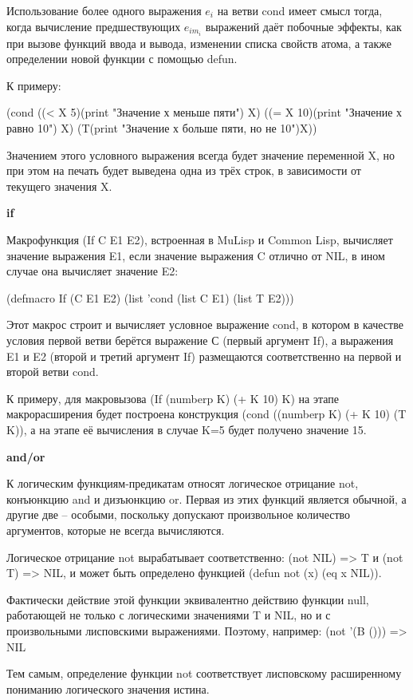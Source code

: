 \documentclass[12pt]{report}
\begin{document}
Использование более одного выражения $e_i$ на ветви cond имеет смысл тогда, когда вычисление предшествующих $e_{im_i}$ выражений даёт побочные эффекты, как при вызове функций ввода и вывода, изменении списка свойств атома, а также определении новой функции с помощью defun. 

К примеру: 

(cond ((< X 5)(print "Значение х меньше пяти") X)
((= X 10)(print "Значение х равно 10") X)
(T(print "Значение х больше пяти, но не 10")X))

Значением этого условного выражения всегда будет значение переменной X, но при этом на печать будет выведена одна из трёх строк, в зависимости от текущего значения X.
 
 
\textbf{if}

Макрофункция (If C E1 E2), встроенная в MuLisp и Common Lisp, вычисляет значение выражения E1, если значение выражения C отлично от NIL, в ином случае она вычисляет значение E2:

(defmacro If (C E1 E2) (list 'cond (list C E1) (list T E2)))

Этот макрос строит и вычисляет условное выражение cond, в котором в качестве условия первой ветви берётся выражение С (первый аргумент If), а выражения E1 и E2 (второй и третий аргумент If) размещаются соответственно на первой и второй ветви cond.

К примеру, для макровызова (If (numberp K) (+ K 10) K) на этапе макрорасширения будет построена конструкция (cond ((numberp K) (+ K 10) (T K)), а на этапе её вычисления в случае K=5 будет получено значение 15.

\textbf{and/or}

К логическим функциям-предикатам относят логическое отрицание not, конъюнкцию and и дизъюнкцию or. Первая из этих функций является обычной, а другие две – особыми, поскольку допускают произвольное количество аргументов, которые не всегда вычисляются. 

Логическое отрицание not вырабатывает соответственно: (not NIL) => T и (not T) => NIL, и может быть определено функцией (defun not (x) (eq x NIL)).

Фактически действие этой функции эквивалентно действию функции null, работающей не только с логическими значениями T и NIL, но и с  произвольными лисповскими выражениями. Поэтому, например: (not '(B ())) => NIL

Тем самым, определение функции not соответствует лисповскому расширенному пониманию логического значения истина. 
\end{document}
